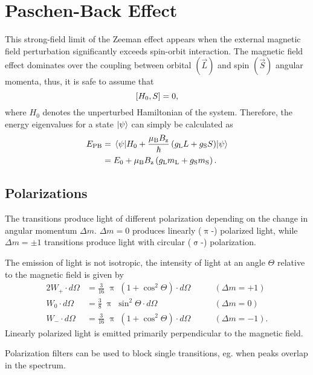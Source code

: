 \section{Paschen-Back Effect}
This strong-field limit of the Zeeman effect appears when the external magnetic field perturbation significantly exceeds spin-orbit interaction.
The magnetic field effect dominates over the coupling between orbital $\left(\vec{L}\right)$ and spin $\left(\vec{S}\right)$ angular momenta, thus, it is safe to assume that
\begin{equation*}
	\comm{H_0}{S} = 0,
\end{equation*}
where $H_0$ denotes the unperturbed Hamiltonian of the system.
Therefore, the energy eigenvalues for a state $\ket{\psi}$ can simply be calculated as
\begin{align*}
	E_\text{PB} &= \ev{H_0+\frac{\mu_\text{B}B_\text{z}}{\hbar}\left(g_\text{L}L+g_\text{S}S\right)}{\psi} \\
	&= E_0 + \mu_\text{B}B_\text{z}\left(g_\text{L}m_\text{L}+g_\text{S}m_\text{S}\right).
\end{align*}

\subsection{Polarizations}
The transitions produce light of different polarization depending on the change in angular momentum $\Delta m$.
$\Delta m = 0$ produces linearly ($\uppi$-) polarized light, while $\Delta m = \pm 1$ transitions produce light with circular ($\upsigma$-) polarization.

The emission of light is not isotropic, the intensity of light at an angle $\Theta$ relative to the magnetic field is given by
\begin{alignat}{2}
	W_+ \cdot d\Omega &= \frac{3}{16} \; \uppi \; (1 + \cos^2 \Theta) \cdot d\Omega \qquad &(\Delta m = +1) \nonumber\\
	W_0 \cdot d\Omega &= \frac{3}{8} \; \uppi \; \sin^2 \Theta \cdot d\Omega \qquad &(\Delta m = 0) \nonumber\\
	W_- \cdot d\Omega &= \frac{3}{16} \; \uppi \; (1 + \cos^2 \Theta) \cdot d\Omega \qquad &(\Delta m = -1). \nonumber
\end{alignat}
Linearly polarized light is emitted primarily perpendicular to the magnetic field.

Polarization filters can be used to block single transitions, eg. when peaks overlap in the spectrum.

